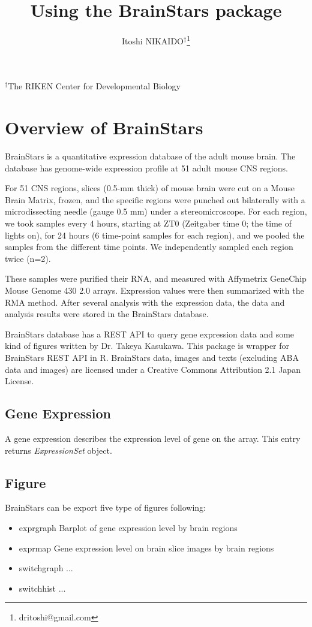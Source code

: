 \documentclass[12pt,fullpage]{article}
\author{Itoshi NIKAIDO$^\ddagger$\footnote{dritoshi@gmail.com}}
\newcommand{\Rclass}[1]{{\textit{#1}}}
\begin{document}
\title{Using the BrainStars package}
\maketitle
\begin{center}$^\ddagger$The RIKEN Center for Developmental Biology
\end{center}


\tableofcontents
\section{Overview of BrainStars} 

BrainStars is a quantitative expression database of the adult
mouse brain. The database has genome-wide expression profile at 51
adult mouse CNS regions.

For 51 CNS regions, slices (0.5-mm thick) of mouse brain were cut on a
Mouse Brain Matrix, frozen, and the specific regions were punched out
bilaterally with a microdissecting needle (gauge 0.5 mm) under a
stereomicroscope. For each region, we took samples every 4 hours,
starting at ZT0 (Zeitgaber time 0; the time of lights on), for 24
hours (6 time-point samples for each region), and we pooled the
samples from the different time points. We independently sampled each
region twice (n=2).

These samples were purified their RNA, and measured with Affymetrix
GeneChip Mouse Genome 430 2.0 arrays. Expression values were then
summarized with the RMA method. After several analysis with the
expression data, the data and analysis results were stored in the
BrainStars database.

BrainStars database has a REST API to query gene expression data and
some kind of figures written by Dr. Takeya Kasukawa. This package is
wrapper for BrainStars REST API in R. BrainStars data, images and
texts (excluding ABA data and images) are licensed under a Creative
Commons Attribution 2.1 Japan License.

\subsection{Gene Expression}
A gene expression describes the expression level of gene on the array. This entry returns \Rclass{ExpressionSet} object.

\subsection{Figure}
BrainStars can be export five type of figures following:
\begin{itemize}
  \item exprgraph Barplot of gene expression level by brain regions
  \item exprmap Gene expression level on brain slice images by brain regions
  \item switchgraph ...
  \item switchhist ...
\end{itemize}
\end{document}
